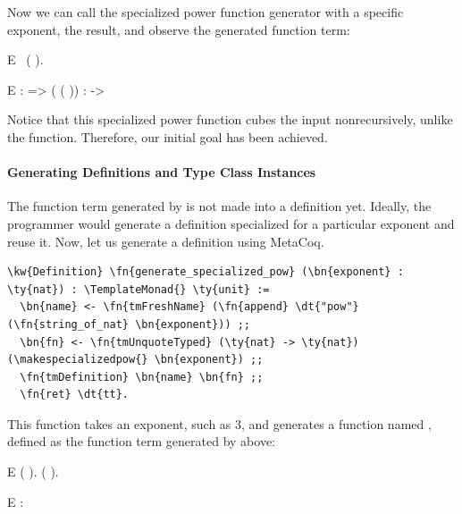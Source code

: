 Now we can call the specialized power function generator with a specific exponent, \unquote{} the result, and observe the generated function term:

\vspace{.2in}
\begin{SaveVerbatim}{E}
 ~(\makespecializedpow{} ).
\end{SaveVerbatim}

\begin{SaveVerbatim}{E}
  :  =>  \fn{*} ( \fn{*} ( \fn{*} )) :  -> 
\end{SaveVerbatim}

Notice that this specialized power function cubes the input nonrecursively, unlike the  function. Therefore, our initial goal has been achieved.

\paragraph*{Generating Definitions and Type Class Instances}

The function term generated by \makespecializedpow{} is not made into a definition yet. Ideally, the programmer would generate a definition specialized for a particular exponent and reuse it. Now, let us generate a definition using MetaCoq.

\begin{Verbatim}
\kw{Definition} \fn{generate_specialized_pow} (\bn{exponent} : \ty{nat}) : \TemplateMonad{} \ty{unit} :=
  \bn{name} <- \fn{tmFreshName} (\fn{append} \dt{"pow"} (\fn{string_of_nat} \bn{exponent})) ;;
  \bn{fn} <- \fn{tmUnquoteTyped} (\ty{nat} -> \ty{nat}) (\makespecializedpow{} \bn{exponent}) ;;
  \fn{tmDefinition} \bn{name} \bn{fn} ;;
  \fn{ret} \dt{tt}.
\end{Verbatim}

This function takes an exponent, such as 3, and generates a function named , defined as the function term generated by \makespecializedpow{} above:

\vspace{.2in}
\begin{SaveVerbatim}{E}
 ( ).
 ( ).
\end{SaveVerbatim}

\begin{SaveVerbatim}{E}
 : 
\end{SaveVerbatim}

